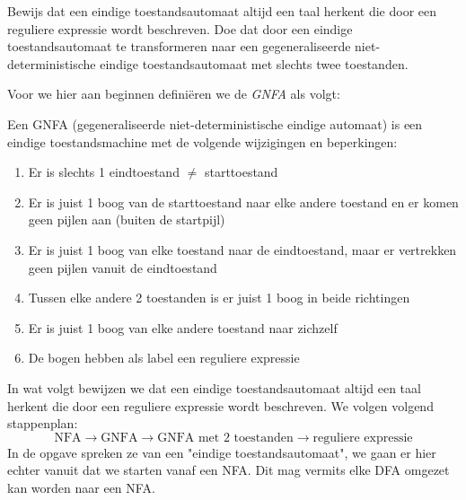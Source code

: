 \begin{question}
Bewijs dat een eindige toestandsautomaat altijd een taal herkent die door een reguliere expressie wordt beschreven. Doe dat door een eindige toestandsautomaat te transformeren naar een gegeneraliseerde niet-deterministische eindige toestandsautomaat met slechts twee toestanden.
\end{question}

Voor we hier aan beginnen defini\"eren we de \emph{GNFA} als volgt:
\begin{theorem}[GNFA]
Een GNFA (gegeneraliseerde niet-deterministische eindige automaat) is een eindige toestandsmachine met de volgende wijzigingen en beperkingen:
\begin{enumerate}
\item Er is slechts 1 eindtoestand $\neq$ starttoestand
\item Er is juist 1 boog van de starttoestand naar elke andere toestand en er komen geen pijlen aan (buiten de startpijl)
\item Er is juist 1 boog van elke toestand naar de eindtoestand, maar er vertrekken geen pijlen vanuit de eindtoestand
\item Tussen elke andere 2 toestanden is er juist 1 boog in beide richtingen
\item Er is juist 1 boog van elke andere toestand naar zichzelf
\item De bogen hebben als label een reguliere expressie
\end{enumerate}
\end{theorem}

In wat volgt bewijzen we dat een eindige toestandsautomaat altijd een taal herkent die door een reguliere expressie wordt beschreven. We volgen volgend stappenplan:
$$ \text{NFA} \rightarrow \text{GNFA} \rightarrow \text{GNFA met 2 toestanden} \rightarrow \text{reguliere expressie} $$
In de opgave spreken ze van een "eindige toestandsautomaat", we gaan er hier echter vanuit dat we starten vanaf een NFA. Dit mag vermits elke DFA omgezet kan worden naar een NFA.

